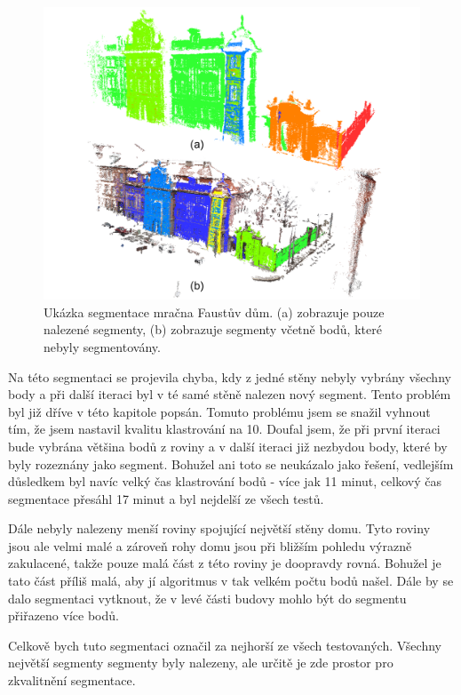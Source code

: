 \documentclass[11pt,twoside,a4paper]{book}
\begin{document}
\begin{figure}[ht]
\begin{center}
\includegraphics[width=\textwidth]{figures/test-fa}
\caption{Ukázka segmentace mračna Faustův dům. (a) zobrazuje pouze nalezené segmenty, (b) zobrazuje segmenty včetně bodů, které nebyly segmentovány.}
\label{fig:test-fa}
\end{center}
\end{figure}

Na této segmentaci se projevila chyba, kdy z jedné stěny nebyly vybrány všechny body a při další iteraci byl v té samé stěně nalezen nový segment. Tento problém byl již dříve v této kapitole popsán. Tomuto problému jsem se snažil vyhnout tím, že jsem nastavil kvalitu klastrování na 10. Doufal jsem, že při první iteraci bude vybrána většina bodů z roviny a v další iteraci již nezbydou body, které by byly rozeznány jako segment. Bohužel ani toto se neukázalo jako řešení, vedlejším důsledkem byl navíc velký čas klastrování bodů - více jak 11 minut, celkový čas segmentace přesáhl 17 minut a byl nejdelší ze všech testů.

Dále nebyly nalezeny menší roviny spojující největší stěny domu. Tyto roviny jsou ale velmi malé a zároveň rohy domu jsou při bližším pohledu výrazně zakulacené, takže pouze malá část z této roviny je doopravdy rovná. Bohužel je tato část příliš malá, aby jí algoritmus v tak velkém počtu bodů našel. Dále by se dalo segmentaci vytknout, že v levé části budovy mohlo být do segmentu přiřazeno více bodů.

Celkově bych tuto segmentaci označil za nejhorší ze všech testovaných. Všechny největší segmenty segmenty byly nalezeny, ale určitě je zde prostor pro zkvalitnění segmentace. 
\end{document}
